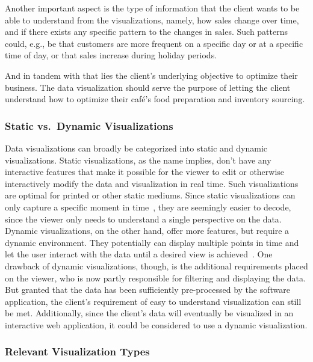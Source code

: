 Another important aspect is the type of information that the client wants to be able to understand from the
visualizations, namely, how sales change over time, and if there exists any specific pattern to the changes in sales.
Such patterns could, e.g., be that customers are more frequent on a specific day or at a specific time of day, or that
sales increase during holiday periods.

And in tandem with that lies the client's underlying objective to optimize their business.
The data visualization should serve the purpose of letting the client understand how to optimize their café's food
preparation and inventory sourcing.

\subsubsection{Static vs.\ Dynamic Visualizations}\label{subsubsec:static-vs-dynamic-visualizations}

Data visualizations can broadly be categorized into static and dynamic visualizations.
Static visualizations, as the name implies, don't have any interactive features that make it possible for the viewer to
edit or otherwise interactively modify the data and visualization in real time.
Such visualizations are optimal for printed or other static mediums.
Since static visualizations can only capture a specific moment in time~\cite{wpDataTablesDynamicVisualization}, they are
seemingly easier to decode, since the viewer only needs to understand a single perspective on the data.
Dynamic visualizations, on the other hand, offer more features, but require a dynamic environment.
They potentially can display multiple points in time and let the user interact with the data until a desired view is
achieved~\cite{wpDataTablesDynamicVisualization}.
One drawback of dynamic visualizations, though, is the additional requirements placed on the viewer, who is now partly
responsible for filtering and displaying the data.
But granted that the data has been sufficiently pre-processed by the software application, the client's requirement of
easy to understand visualization can still be met.
Additionally, since the client's data will eventually be visualized in an interactive web application, it could be
considered to use a dynamic visualization.

\subsubsection{Relevant Visualization Types}\label{subsubsec:relevant-visualization-types}

